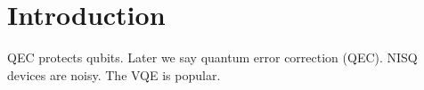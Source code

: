 \documentclass{article}
\begin{document}
\begin{abstract}Variational quantum eigensolver (VQE) results.\end{abstract}
\section{Introduction}
QEC protects qubits. Later we say quantum error correction (QEC). NISQ devices are noisy. The VQE is popular.
\end{document}
